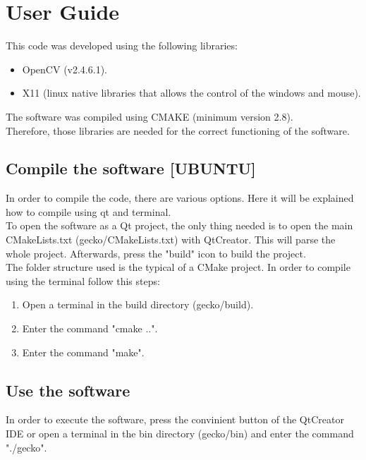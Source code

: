 \section{User Guide}
This code was developed using the following libraries: 
\begin{itemize}
\item OpenCV (v2.4.6.1).
\item X11 (linux native libraries that allows the control of the windows and mouse). 
\end{itemize}
The software was compiled using CMAKE (minimum version 2.8).
\\[0.5cm]
Therefore, those libraries are needed for the correct functioning of the software. 


\subsection{Compile the software [UBUNTU]}

In order to compile the code, there are various options. Here it will be explained how to compile using qt and terminal. 
\\
To open the software as a Qt project, the only thing needed is to open the main CMakeLists.txt (gecko/CMakeLists.txt) with QtCreator. This will parse the whole project. 
Afterwards, press the "build" icon to build the project. 
\\[0.5cm]
The folder structure used is the typical of a CMake project. In order to compile using the terminal follow this steps: 
\begin{enumerate}
 \item Open a terminal in the build directory (gecko/build). 
 \item Enter the command "cmake ..". 
 \item Enter the command "make". 
\end{enumerate}

\subsection{Use the software}
In order to execute the software, press the convinient button of the QtCreator IDE or open a terminal in the bin directory (gecko/bin) and enter the command "./gecko". 

